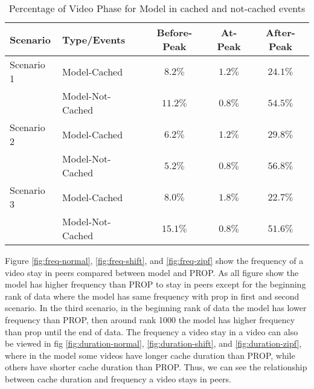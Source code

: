 \begin{table}[!t]
\caption{Percentage of Video Phase for Model in cached and not-cached events}
\label{tab:stacked2}
\centering
\begin{tabular}{|l|l|c|c|c|}
\hline
Scenario & Type/Events & Before-Peak & At-Peak & After-Peak\\
\hline
Scenario 1 & Model-Cached & $8.2\%$ & $1.2\%$ & $24.1\%$ \\
\hline
 & Model-Not-Cached & $11.2\%$ & $0.8\%$ & $54.5\%$ \\
 \hline

Scenario 2 & Model-Cached & $6.2\%$ & $1.2\%$ & $29.8\%$ \\
\hline
 & Model-Not-Cached & $5.2\%$ & $0.8\%$ & $56.8\%$ \\
\hline

Scenario 3 & Model-Cached & $8.0\%$ & $1.8\%$ & $22.7\%$ \\
\hline
 & Model-Not-Cached & $15.1\%$ & $0.8\%$ & $51.6\%$ \\
\hline
\end{tabular}
\end{table}

Figure \ref{fig:freq-normal}, \ref{fig:freq-shift}, and \ref{fig:freq-zipf} show the frequency of a video stay in peers compared between model and PROP.
As all figure show the model has higher frequency than PROP to stay in peers except for the beginning rank of data where the model has same frequency with prop in first and second scenario. 
In the third scenario, in the beginning rank of data the model has lower frequency than PROP, then around rank 1000 the model has higher frequency than prop until the end of data. 
The frequency a video stay in a video can also be viewed in fig \ref{fig:duration-normal},  \ref{fig:duration-shift}, and \ref{fig:duration-zipf}, where in the model some videos have longer cache duration than PROP, while others have shorter cache duration than PROP.  
Thus, we can see the relationship between cache duration and frequency a video stays in peers. 


